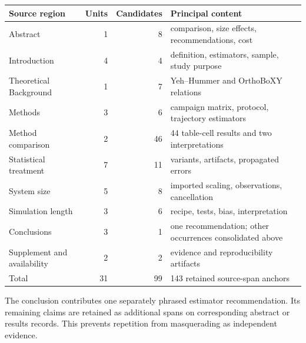 \begin{center}
\small
\begin{tabular}{lrrl}
\toprule
Source region & Units & Candidates & Principal content \\
\midrule
Abstract & 1 & 8 & comparison, size effects, recommendations, cost \\
Introduction & 4 & 4 & definition, estimators, sample, study purpose \\
Theoretical Background & 1 & 7 & Yeh--Hummer and OrthoBoXY relations \\
Methods & 3 & 6 & campaign matrix, protocol, trajectory estimators \\
Method comparison & 2 & 46 & 44 table-cell results and two interpretations \\
Statistical treatment & 7 & 11 & variants, artifacts, propagated errors \\
System size & 5 & 8 & imported scaling, observations, cancellation \\
Simulation length & 3 & 6 & recipe, tests, bias, interpretation \\
Conclusions & 3 & 1 & one recommendation; other occurrences consolidated above \\
Supplement and availability & 2 & 2 & evidence and reproducibility artifacts \\
\midrule
Total & 31 & 99 & 143 retained source-span anchors \\
\bottomrule
\end{tabular}
\end{center}

The conclusion contributes one separately phrased estimator recommendation. Its remaining claims are retained as additional spans on corresponding abstract or results records. This prevents repetition from masquerading as independent evidence.

